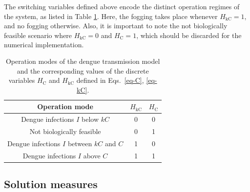 \documentclass[preprint]{elsarticle}
\begin{document}
The switching variables defined above encode the distinct operation regimes of the system, as listed in Table \ref{tab-modes}. Here, the fogging takes place whenever $H_{\mathrm{kC}}=1$, and no fogging otherwise. Also, it is important to note the not biologically feasible scenario where $H_{\mathrm{kC}}=0$ and $H_{\mathrm{C}}=1$, which should be discarded for the numerical implementation.

\begin{table}[htpb!]
	\caption{Operation modes of the dengue transmission model and the corresponding
		values of the discrete variables $H_{\mathrm{C}}$ and $H_{\mathrm{kC}}$
		defined in Eqs.\ \eqref{eq-C}, \eqref{eq-kC}.} \label{tab-modes} \vspace{-10pt}
	\begin{center}
		\small {}\begin{tabular}{|c|c|c|}\hline
			\textbf{Operation mode} & $H_{\mathrm{kC}}$ & $H_{\mathrm{C}}$\\
			\hline
			Dengue infections $I$ below $kC$ & 0 & 0\\
			\hline	Not biologically feasible & 0 & 1\\
			\hline	Dengue infections $I$ between $kC$ and $C$ & 1 & 0\\
			\hline	Dengue infections $I$ above $C$ & 1 & 1\\
			\hline
		\end{tabular}
	\end{center}
\end{table}



\subsection{Solution measures}\label{sec-measures}
\end{document}
